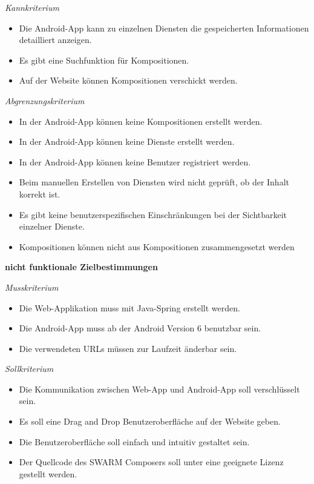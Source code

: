 \textit{Kannkriterium}

\begin{itemize}[leftmargin=4pc]
	\item Die Android-App kann zu einzelnen Diensten die gespeicherten Informationen detailliert anzeigen.
	\item Es gibt eine Suchfunktion für Kompositionen.
	\item Auf der Website können Kompositionen verschickt werden.
\end{itemize}

\textit{Abgrenzungskriterium}

\begin{itemize}[leftmargin=4pc]
	\item In der Android-App können keine Kompositionen erstellt werden.
	\item In der Android-App können keine Dienste erstellt werden.
	\item In der Android-App können keine Benutzer registriert werden.
	\item Beim manuellen Erstellen von Diensten wird nicht geprüft, ob der Inhalt korrekt ist.
	\item Es gibt keine benutzerspezifischen Einschränkungen bei der Sichtbarkeit einzelner Dienste.
	\item Kompositionen können nicht aus Kompositionen zusammengesetzt werden
\end{itemize}


\textbf{nicht funktionale Zielbestimmungen}\newline

\textit{Musskriterium}

\begin{itemize}[leftmargin=4pc]
	\item Die Web-Applikation muss mit Java-Spring erstellt werden.
	\item Die Android-App muss ab der Android Version 6 benutzbar sein.
	\item Die verwendeten URLs müssen zur Laufzeit änderbar sein.
\end{itemize}

\textit{Sollkriterium}

\begin{itemize}[leftmargin=4pc]
	\item Die Kommunikation zwischen Web-App und Android-App soll verschlüsselt sein.
	\item Es soll eine Drag and Drop Benutzeroberfläche auf der Website geben.
	\item Die Benutzeroberfläche soll einfach und intuitiv gestaltet sein.
	\item Der Quellcode des SWARM Composers soll unter eine geeignete Lizenz gestellt werden.
\end{itemize}

